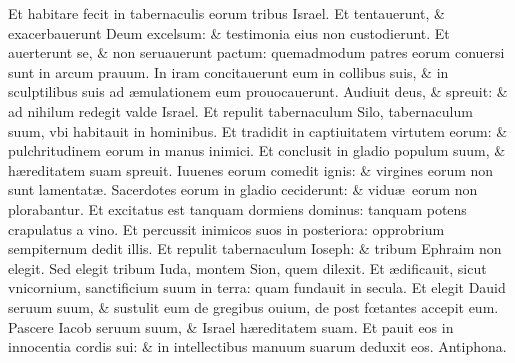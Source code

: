 \documentclass[a5paper,10pt]{book}
\def\ae{æ}
\def\oe{œ}
\begin{document}
\begin{multicols*}{2}
\newline \color{red} E\color{black}t habitare fecit in tabernaculis eorum tribus Israel.
\newline \color{red} E\color{black}t tentauerunt, \& exacerbauerunt Deum excelsum: \& testimonia eius non custodierunt.
\newline \color{red} E\color{black}t auerterunt se, \& non seruauerunt pactum: quemadmodum patres eorum conuersi sunt in arcum prauum.
\newline \color{red} I\color{black}n iram concitauerunt eum in collibus suis, \& in sculptilibus suis ad \ae mulationem eum prouocauerunt.
\newline \color{red} A\color{black}udiuit deus, \& spreuit: \& ad nihilum redegit valde Israel.
\newline \color{red} E\color{black}t repulit tabernaculum Silo, tabernaculum suum, vbi habitauit in hominibus.
\newline \color{red} E\color{black}t tradidit in captiuitatem virtutem eorum: \& pulchritudinem eorum in manus inimici.
\newline \color{red} E\color{black}t conclusit in gladio populum suum, \& h\ae reditatem suam spreuit.
\newline \color{red} I\color{black}uuenes eorum comedit ignis: \& virgines eorum non sunt lamentat\ae .
\newline \color{red} S\color{black}acerdotes eorum in gladio ceciderunt: \& vidu\ae \ eorum non plorabantur.
\newline \color{red} E\color{black}t excitatus est tanquam dormiens dominus: tanquam potens crapulatus a vino.
\newline \color{red} E\color{black}t percussit inimicos suos in posteriora: opprobrium sempiternum dedit illis.
\newline \color{red} E\color{black}t repulit tabernaculum Ioseph: \& tribum Ephraim non elegit.
\newline \color{red} S\color{black}ed elegit tribum Iuda, montem Sion, quem dilexit.
\newline \color{red} E\color{black}t \ae dificauit, sicut vnicornium, sanctificium suum in terra: quam fundauit in secula.
\newline \color{red} E\color{black}t elegit Dauid seruum suum, \& sustulit eum de gregibus ouium, de post f\oe tantes accepit eum.
\newline \color{red} P\color{black}ascere Iacob seruum suum, \& Israel h\ae reditatem suam.
\newline \color{red} E\color{black}t pauit eos in innocentia cordis sui: \& in intellectibus manuum suarum deduxit eos. \quad \color{red} Antiphona. \color{black}

\end{multicols*}
\end{document}

